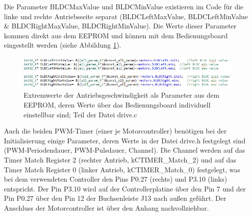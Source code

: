 Die Parameter BLDCMaxValue und BLDCMinValue existieren im Code für die linke und rechte Antriebsseite separat (\glqq{}BLDCLeftMaxValue\grqq{}, \glqq{}BLDCLeftMinValue\grqq{} \& \glqq{}BLDCRightMaxValue\grqq{}, \glqq{}BLDCRightMinValue\grqq{}). Die Werte dieser Parameter kommen direkt aus dem \ac{EEPROM} und können mit dem Bedienungsboard eingestellt werden (siehe Abbildung \ref{fig:DriveC0}).\vspace{11pt}

\begin{figure}[H] %
\includegraphics[width=.95\textwidth]{sec4/images/DriveC0} 
\centering
\captionsetup{width=.95\textwidth}
\caption[Extremwerte der Antriebsgeschwindigkeit als Parameter aus dem \ac{EEPROM}]{Extremwerte der Antriebsgeschwindigkeit als Parameter aus dem \ac{EEPROM}, deren Werte über das Bedienungsboard individuell einstellbar sind; Teil der Datei \glqq{}drive.c\grqq{}}\centering
\label{fig:DriveC0}
\end{figure}

Auch die beiden \ac{PWM}-Timer (einer je Motorcontroller) benötigen bei der Initialisierung einige Parameter, deren Werte in der Datei \glqq{}drive.h\grqq{} festgelegt sind (PWM-Periodendauer, \ac{PWM}-Pulsdauer, Channel). Die Channel werden auf das Timer Match Register 2 (rechter Antrieb, \glqq{}kCTIMER\_Match\_2\grqq{}) und auf das Timer Match Register 0 (linker Antrieb, \glqq{}kCTIMER\_Match\_0\grqq{}) festgelegt, was bei dem verwendeten Controller den Pins P0.27 (rechts) und P3.10 (links) entspricht. Der Pin P3.10 wird auf der Controllerplatine über den Pin 7 und der Pin P0.27 über den Pin 12 der Buchsenleiste J13 nach außen geführt. Der Anschluss der Motorcontroller ist über den Anhang \glqq{}\grqq{} nachvollziehbar.\vspace{11pt}

